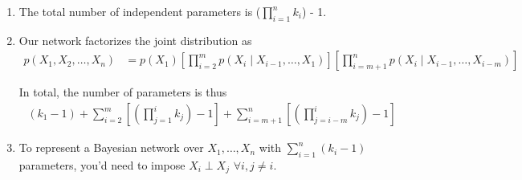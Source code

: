 \documentclass[11pt]{article}
\begin{document}
\begin{enumerate}
	\item The total number of independent parameters is ($\prod_{i=1}^{n} k_i$) - 1. 
	
	

	\item Our network factorizes the joint distribution as
	\begin{align}
		p(X_1, X_2, \ldots, X_n)
			&= p(X_1) 
				\left[ \prod_{i=2}^{m} p(X_i \mid X_{i-1}, \ldots, X_1) \right] 
				\left[  \prod_{i=m+1}^{n} p(X_i \mid X_{i-1}, \ldots, X_{i-m}) \right]
	\end{align}
	
	In total, the number of parameters is thus
	\begin{align}
		(k_1 -1) +  \sum_{i=2}^{m} \left[ ( \prod_{j=1}^{i} k_j ) -1 \right] +  \sum_{i=m+1}^{n} \left[ ( \prod_{j=i-m}^{i} k_j ) -1\right] 
	\end{align}
	\begin{comment}
		\item Our network factorizes the joint distribution as
	\begin{align}
	& p(X_1) 
	\left[ \prod_{i=2}^{m} p(X_i \mid X_{i-1}, \ldots, X_1) \right] 
	\left[  \prod_{i=m+1}^{n} p(X_i \mid X_{i-1}, \ldots, X_{i-m}) \right] \\
	=~ & p(X_1, \ldots, X_m)
	\left[  \prod_{i=m+1}^{n} p(X_i \mid X_{i-1}, \ldots, X_{i-m}) \right] 
	\end{align}
	\begin{compactitem}
		\item $p(X_1, \ldots, X_m)$ requires $(\prod_{i=1}^m k_i) -1$ parameters.
		
		\item For $i > m$, $p(X_i \mid X_{i-1}, \ldots, X_{i - m})$ requires $(\prod_{j=i-m}^{i} k_j) - 1$ parameters.
	\end{compactitem}
	
	In total, the number of parameters is thus
	\begin{align}
	\left[ \prod_{i=1}^m k_i \right]  + \left[ \sum_{i=m+1}^{n} \prod_{j=i-m}^{i} k_j  \right] - m
	\end{align}
	\end{comment}
	
	\item To represent a Bayesian network over $X_1, \ldots, X_n$ with $\sum_{i=1}^{n} (k_i -1)$ parameters, you'd need to impose $X_i \perp X_{j}$ $\forall i, j \ne i$. 


\end{enumerate}
\end{document}
